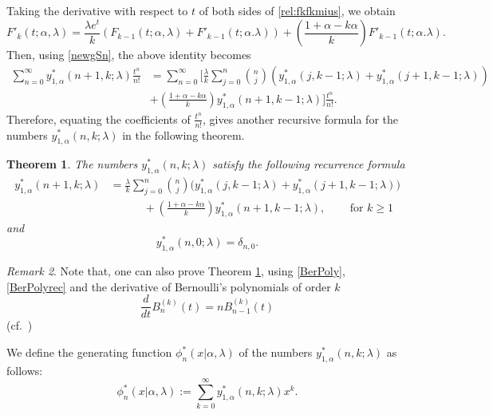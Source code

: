 \documentclass{amsart}
\newtheorem{theorem}{Theorem}[section]
\numberwithin{equation}{section}
\theoremstyle{definition}
\theoremstyle{remark}
\newtheorem{remark}[theorem]{Remark}
\begin{document}
Taking the derivative with respect to $t$ of both sides of \eqref{rel:fkfkmius}, we obtain
\begin{equation*}
F'_{k}(t;\alpha,\lambda)=\frac{\lambda e^t}{k}\left(F_{k-1}(t;\alpha,\lambda)+F'_{k-1}(t;\alpha.\lambda)\right)+\left(\frac{1+\alpha-k\alpha}{k}\right)F'_{k-1}(t;\alpha.\lambda).
\end{equation*}
Then, using \eqref{newgSn}, the above identity becomes
\begin{equation*} 
\begin{split}
\sum_{n=0}^{\infty}y_{1,\alpha}^{*}(n+1,k;\lambda)\frac{t^n}{n!}& = \sum_{n=0}^{\infty}\Bigg[\frac{\lambda}{k}\sum_{j=0}^{n}\binom{n}{j}\left(y_{1,\alpha}^{*}(j,k-1;\lambda)+y_{1,\alpha}^{*}(j+1,k-1;\lambda)\right)\\
 &+\left(\frac{1+\alpha-k\alpha}{k}\right)y_{1,\alpha}^{*}(n+1,k-1;\lambda)\Bigg]\frac{t^n}{n!}.
\end{split}
\end{equation*}
Therefore, equating the coefficients of $\frac{t^n}{n!}$, gives another recursive formula for the numbers $y_{1,\alpha}^{*}(n,k;\lambda)$ in the following theorem.
\begin{theorem}\label{thmrecforn}
The numbers $y_{1,\alpha}^{*}(n,k;\lambda)$ satisfy the following recurrence formula
\begin{equation*}
\begin{split}
 y_{1,\alpha}^{*}(n+1,k;\lambda)&=\frac{\lambda}{k}\sum_{j=0}^{n}\binom{n}{j}\bigg(y_{1,\alpha}^{*}(j,k-1;\lambda)+y_{1,\alpha}^{*}(j+1,k-1;\lambda)\bigg)\\
 &\quad\qquad +\left(\frac{1+\alpha-k\alpha}{k}\right)y_{1,\alpha}^{*}(n+1,k-1;\lambda)\text{,} \qquad \text{ for } k\geq 1   
 \end{split}
\end{equation*}
and $$y_{1,\alpha}^{*}(n,0;\lambda)=\delta_{n,0}.$$
\end{theorem} 
\begin{remark}
Note that, one can also prove Theorem \ref{thmrecforn}, using \eqref{BerPoly}, \eqref{BerPolyrec} and the derivative of Bernoulli's polynomials of order $k$
\begin{equation}
\frac{d}{dt}B_{n}^{(k)}(t)=nB_{n-1}^{(k)}(t)
\end{equation}
(cf.~\cite{LLM1980}) 
\end{remark}
We define the generating function $\phi^{*}_{n}(x|\alpha,\lambda)$ of the numbers $y_{1,\alpha}^{*}(n,k;\lambda)$ as follows:
\begin{equation}\label{gfndsn}
 \phi^{*}_{n}(x|\alpha,\lambda):=\sum\limits_{k=0}^{\infty}y_{1,\alpha}^{*}(n,k;\lambda)x^k.  
\end{equation}
\end{document}
